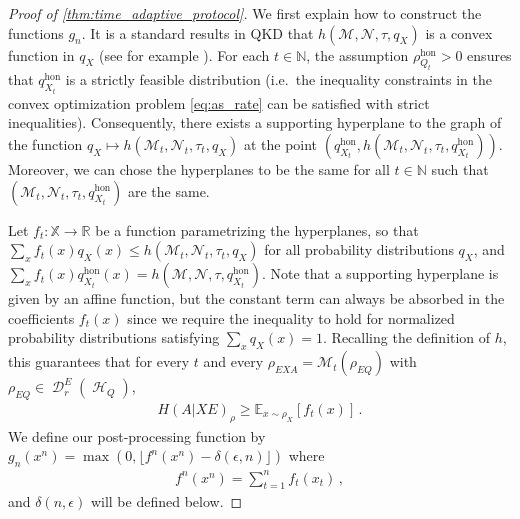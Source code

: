 \documentclass[11pt]{article}
\newcommand{\1}{\ensuremath{\mathbbm{1}}}
\theoremstyle{newdefinition}
\theoremstyle{newplain}
\theoremstyle{myplain}
\DeclareMathOperator{\cH}{\mathcal{H}}
\DeclareMathOperator{\cD}{\mathcal{D}}
\begin{document}
\begin{proof}[Proof of \cref{thm:time_adaptive_protocol}]
We first explain how to construct the functions $g_n$.
It is a standard results in QKD that $ h(\mathcal M,\mathcal N,\tau,q_{X})$ is a convex function in $q_X$ (see for example \cite{Winick.2018}). For each $t\in \mathbb N$, the assumption $\rho^{\mathrm{hon}}_{Q_t} > 0$ ensures that $q_{X_t}^{\mathrm{hon}}$ is a strictly feasible distribution (i.e.\ the inequality constraints in the convex optimization problem \eqref{eq:as_rate} can be satisfied with strict inequalities). Consequently, there exists a  supporting hyperplane to the graph of the function $q_X \mapsto h(\mathcal M_t,\mathcal N_t,\tau_t, q_X)$ at the point $(q^{\mathrm{hon}}_{X_t},h(\mathcal M_t,\mathcal N_t,\tau_t, q^{\mathrm{hon}}_{X_t}))$. Moreover, we can chose the hyperplanes to be the same for all $t\in \mathbb N$ such that $(\mathcal M_t,\mathcal N_t,\mathcal \tau_t,q^{\mathrm{hon}}_{X_t})$ are the same.

Let $f_t:\mathbb{X}\to \mathbb R$ be a function parametrizing the hyperplanes, so that $\sum_x f_t(x) q_{X}(x) \leq h(\mathcal M_t,\mathcal N_t,\tau_t,q_{X})$ for all probability distributions $q_X$, and $\sum_x f_t(x) q^{\mathrm{hon}}_{X_t}(x) =h(\mathcal M,\mathcal N,\tau,q^{\mathrm{hon}}_{X_t})$. Note that a supporting hyperplane is given by an affine function, but the constant term can always be absorbed in the coefficients $f_t(x)$ since we require the inequality to hold for normalized probability distributions satisfying $\sum_{x} q_{X}(x) = 1$. %
Recalling the definition of $h$, this guarantees that for every $t$ and every $\rho_{EXA} = \mathcal M_t(\rho_{EQ})$ with $\rho_{EQ}\in \cD_r^E(\cH_Q)$,
\begin{align}
    H(A|XE)_{\rho} \geq \mathbb E_{x \sim \rho_X}[f_t(x)]\,.
\end{align}
We define our post-processing function by $g_n(x^n) = \max(0, \lfloor f^n(x^n) - \delta(\epsilon,n)\rfloor)$ where
\begin{align}
    f^n(x^n) = \sum_{t=1}^n f_t(x_t)\,,
\end{align}
and $\delta(n,\epsilon)$ will be defined below.



\end{proof}
\end{document}
